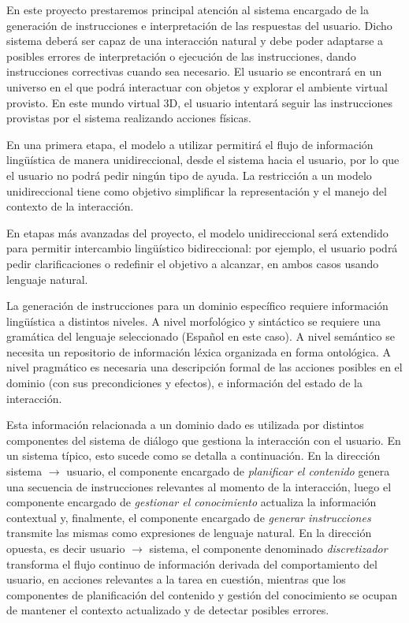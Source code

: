 

En este proyecto prestaremos principal atenci\'on al sistema encargado de la
generaci\'on de  instrucciones e interpretaci\'on de las respuestas del usuario.
Dicho sistema deber\'a ser capaz de una interacci\'on natural y debe poder adaptarse a
posibles errores de interpretaci\'on o ejecuci\'on de las instrucciones, dando
instrucciones correctivas cuando sea necesario. El usuario se encontrar\'a
en un universo en el que podr\'a interactuar con objetos y explorar el ambiente
virtual provisto. En este mundo virtual 3D, el usuario intentar\'a seguir las instrucciones
provistas por el sistema realizando acciones f\'isicas.

En una primera etapa, el modelo a utilizar permitir\'a el flujo de informaci\'on
ling\"u\'istica de manera unidireccional, desde el sistema hacia el usuario, por lo que
el usuario no podr\'a pedir ning\'un tipo de ayuda.  La restricci\'on a un
modelo unidireccional tiene como objetivo
simplificar la representaci\'on y el manejo del contexto de la interacci\'on.

En etapas m\'as avanzadas del proyecto, el modelo unidireccional ser\'a
extendido para
permitir intercambio ling\"u\'istico bidireccional: por ejemplo, el usuario
podr\'a
pedir clarificaciones o redefinir el objetivo a alcanzar, en ambos casos usando
lenguaje natural.

La generaci\'on de instrucciones para un dominio espec\'ifico requiere
informaci\'on  ling\"u\'istica a distintos niveles.
A nivel morfol\'ogico y sint\'actico se requiere una
gram\'atica del lenguaje seleccionado (Espa\~nol en este caso). A nivel
sem\'antico se necesita un repositorio de informaci\'on l\'exica organizada en
forma ontol\'ogica. A nivel pragm\'atico es necesaria una descripci\'on formal de
las
acciones posibles en el dominio (con sus precondiciones y efectos), e
informaci\'on del estado de la interacci\'on.

Esta informaci\'on relacionada a un dominio dado es utilizada por distintos
componentes del sistema de di\'alogo que
gestiona la interacci\'on con el usuario. En un sistema t\'ipico, esto
sucede como se detalla a continuaci\'on.  En la direcci\'on sistema $\rightarrow$
usuario, el componente encargado de \emph{planificar el contenido} genera una secuencia de
instrucciones relevantes al momento de la interacci\'on, luego el componente
encargado de  \emph{gestionar el conocimiento} actualiza la informaci\'on
contextual y,  finalmente, el componente encargado de
\emph{generar instrucciones}  transmite las mismas como expresiones
de lenguaje natural.  En la direcci\'on opuesta, es decir usuario $\rightarrow$
sistema,  el componente denominado \emph{discretizador}
transforma el flujo continuo de informaci\'on derivada del comportamiento del
usuario, en acciones relevantes a la tarea en cuesti\'on, mientras que
los componentes de planificaci\'on del contenido y gesti\'on del conocimiento se ocupan
de mantener el contexto actualizado y de detectar posibles errores.

